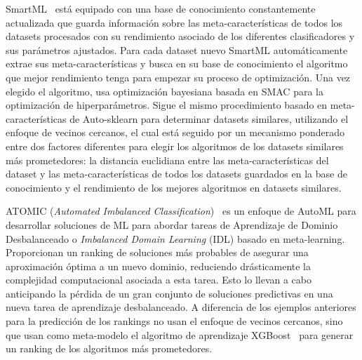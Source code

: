 \documentclass[a4paper,12pt]{article}
\begin{document}
SmartML~\cite{maher2019smartml} está equipado con una base de conocimiento constantemente actualizada que guarda información sobre las meta-características de todos los datasets procesados con su rendimiento asociado de los diferentes clasificadores y sus parámetros ajustados. Para cada dataset nuevo SmartML automáticamente extrae sus meta-características y busca en su base de conocimiento el algoritmo que mejor rendimiento tenga para empezar su proceso de optimización. Una vez elegido el algoritmo, usa optimización bayesiana basada en SMAC para la optimización de hiperparámetros. Sigue el mismo procedimiento basado en meta-características de Auto-sklearn para determinar datasets similares, utilizando el enfoque de vecinos cercanos, el cual está seguido por un mecanismo ponderado entre dos factores diferentes para elegir los algoritmos de los datasets similares más prometedores: la distancia euclidiana entre las meta-características del dataset y las meta-características de todos los datasets guardados en la base de conocimiento y el rendimiento de los mejores algoritmos en datasets similares.


ATOMIC (\textit{Automated Imbalanced Classification})~\cite{atomic} es un enfoque de AutoML para desarrollar soluciones de ML para abordar tareas de Aprendizaje de Dominio Desbalanceado o \textit{Imbalanced Domain Learning} (IDL) basado en meta-learning. Proporcionan un ranking de soluciones más probables de asegurar una aproximación óptima a un nuevo dominio, reduciendo drásticamente la complejidad computacional asociada a esta tarea. Esto lo llevan a cabo anticipando la pérdida de un gran conjunto de soluciones predictivas en una nueva tarea de aprendizaje desbalanceado. A diferencia de los ejemplos anteriores para la predicción de los rankings no usan el enfoque de vecinos cercanos, sino que usan como meta-modelo el algoritmo de aprendizaje XGBoost~\cite{xgboost} para generar un ranking de los algoritmos más prometedores. 
\end{document}

